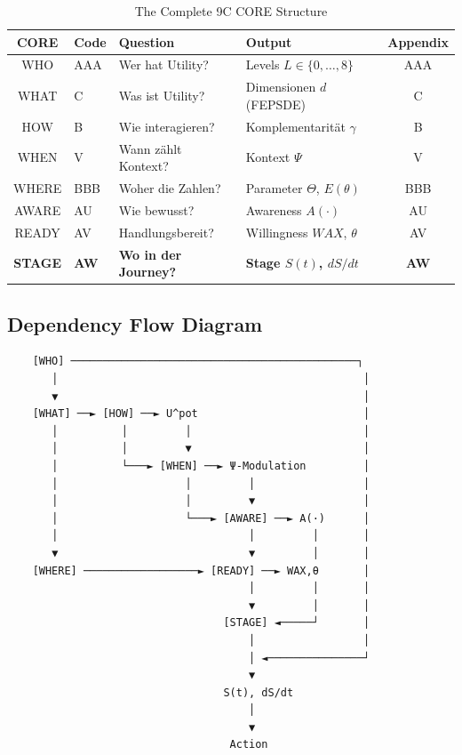 \begin{table}[htbp]
\centering
\caption{The Complete 9C CORE Structure}
\label{tab:8c-overview}
\renewcommand{\arraystretch}{1.4}
\begin{tabular}{@{}clllc@{}}
\toprule
\textbf{CORE} & \textbf{Code} & \textbf{Question} & \textbf{Output} & \textbf{Appendix} \\
\midrule
WHO & AAA & Wer hat Utility? & Levels $L \in \{0,\ldots,8\}$ & AAA \\
WHAT & C & Was ist Utility? & Dimensionen $d$ (FEPSDE) & C \\
HOW & B & Wie interagieren? & Komplementarität $\gamma$ & B \\
WHEN & V & Wann zählt Kontext? & Kontext $\Psi$ & V \\
WHERE & BBB & Woher die Zahlen? & Parameter $\Theta$, $E(\theta)$ & BBB \\
AWARE & AU & Wie bewusst? & Awareness $A(\cdot)$ & AU \\
READY & AV & Handlungsbereit? & Willingness $WAX$, $\theta$ & AV \\
\rowcolor{yellow!20}
\textbf{STAGE} & \textbf{AW} & \textbf{Wo in der Journey?} & \textbf{Stage $S(t)$, $dS/dt$} & \textbf{AW} \\
\bottomrule
\end{tabular}
\end{table}

\subsection{Dependency Flow Diagram}

\begin{tcolorbox}[colback=gray!5!white, colframe=gray!75!black,
    title=9C Causal Flow]
\begin{verbatim}
    [WHO] ─────────────────────────────────────────────┐
       │                                                │
       ▼                                                │
    [WHAT] ──► [HOW] ──► U^pot                          │
       │          │         │                           │
       │          │         ▼                           │
       │          └───► [WHEN] ──► Ψ-Modulation         │
       │                    │         │                 │
       │                    │         ▼                 │
       │                    └───► [AWARE] ──► A(·)      │
       │                              │         │       │
       ▼                              ▼         │       │
    [WHERE] ──────────────────► [READY] ──► WAX,θ       │
                                      │         │       │
                                      ▼         │       │
                                  [STAGE] ◄─────┘       │
                                      │                 │
                                      │ ◄───────────────┘
                                      ▼
                                  S(t), dS/dt
                                      │
                                      ▼
                                   Action
\end{verbatim}
\end{tcolorbox}

